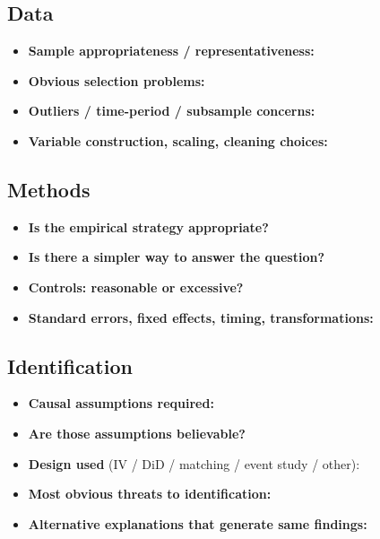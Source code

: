 \documentclass[11pt, letterpaper]{article}
\begin{document}
\subsection{Data}
\begin{itemize}[leftmargin=*, nosep]
  \item \textbf{Sample appropriateness / representativeness:}
  \vspace{1.5cm}
  \item \textbf{Obvious selection problems:}
  \vspace{1.5cm}
  \item \textbf{Outliers / time-period / subsample concerns:}
  \vspace{1.5cm}
  \item \textbf{Variable construction, scaling, cleaning choices:}
  \vspace{1.5cm}
\end{itemize}

\subsection{Methods}
\begin{itemize}[leftmargin=*, nosep]
  \item \textbf{Is the empirical strategy appropriate?}
  \vspace{1.5cm}
  \item \textbf{Is there a simpler way to answer the question?}
  \vspace{1.5cm}
  \item \textbf{Controls: reasonable or excessive?}
  \vspace{1.5cm}
  \item \textbf{Standard errors, fixed effects, timing, transformations:}
  \vspace{1.5cm}
\end{itemize}

\subsection{Identification}
\begin{itemize}[leftmargin=*, nosep]
  \item \textbf{Causal assumptions required:}
  \vspace{1.5cm}
  \item \textbf{Are those assumptions believable?}
  \vspace{1.5cm}
  \item \textbf{Design used} (IV / DiD / matching / event study / other):
  \vspace{0.5cm}
  \item \textbf{Most obvious threats to identification:}
  \vspace{1.5cm}
  \item \textbf{Alternative explanations that generate same findings:}
  \vspace{1.5cm}
\end{itemize}
\end{document}
